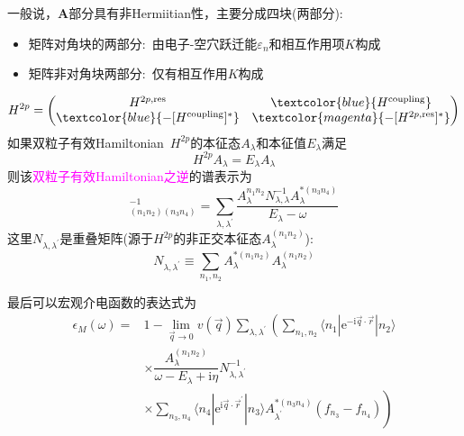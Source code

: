 {{{{\vskip 3pt
一般说，$\mathbf{A}$部分具有非\textrm{Hermiitian}性，主要分成四块(两部分):
\begin{itemize}
	\item 矩阵对角块的两部分:~由电子-空穴跃迁能$\varepsilon_n$和相互作用项$K$构成
	\item 矩阵非对角块两部分:~仅有相互作用$K$构成
\end{itemize}
\begin{displaymath}
	H^{2p}=\begin{pmatrix}
		H^{2p,\mathrm{res}} &\textcolor{blue}{H^{\mathrm{coupling}}}\\	
		\textcolor{blue}{-[H^{\mathrm{coupling}}]^{\ast}} &\textcolor{magenta}{-[H^{2p,\mathrm{res}}]^{\ast}}
	\end{pmatrix}
\end{displaymath}
{\fontsize{5.0pt}{4.2pt}}
\vskip 3pt
如果双粒子有效\textrm{Hamiltonian}~$H^{2p}$的本征态$A_{\lambda}$和本征值$E_{\lambda}$满足
\begin{displaymath}
	H^{2p}A_{\lambda}=E_{\lambda}A_{\lambda}
\end{displaymath}
则该\textcolor{magenta}{双粒子有效\textrm{Hamiltonian}之逆}的谱表示为
\begin{displaymath}
	[H^{2p}-I\omega]_{(n_1n_2)(n_3n_4)}^{-1}=\sum_{\lambda,\lambda^{\prime}}\dfrac{A_{\lambda}^{n_1n_2}N_{\lambda,\lambda}^{-1}A_{\lambda}^{\ast(n_3n_4)}}{E_{\lambda}-\omega}
\end{displaymath}
这里$N_{\lambda,\lambda^{\prime}}$是重叠矩阵(源于$H^{2p}$的非正交本征态$A_{\lambda}^{(n_1n_2)}$):
\begin{displaymath}
	N_{\lambda,\lambda^{\prime}}\equiv\sum_{n_1,n_2}A_{\lambda}^{\ast(n_1n_2)}A_{\lambda}^{(n_1n_2)}
\end{displaymath} }}
最后可以宏观介电函数的表达式为
\begin{displaymath}
	\begin{aligned}
		\epsilon_M(\omega)=&1-\mathop{\mathrm{lim}}\limits_{\vec q\rightarrow0}v(\vec q)\sum_{\lambda,\lambda^{\prime}}\left(\sum_{n_1,n_2}\langle n_1|\mathrm{e}^{-\mathrm{i}\vec q\cdot\vec r}|n_2\rangle\right.\\
		&\times\dfrac{A_{\lambda}^{(n_1n_2)}}{\omega-E_{\lambda}+\mathrm{i}\eta}N_{\lambda,\lambda^{\prime}}^{-1}\\
		&\left.\times\sum_{n_3,n_4}\langle n_4|\mathrm{e}^{\mathrm{i}\vec q\cdot\vec r^{\prime}}|n_3\rangle A_{\lambda^{\prime}}^{\ast(n_3n_4)}(f_{n_3}-f_{n_4})\right)
	\end{aligned}
\end{displaymath}
}

}
